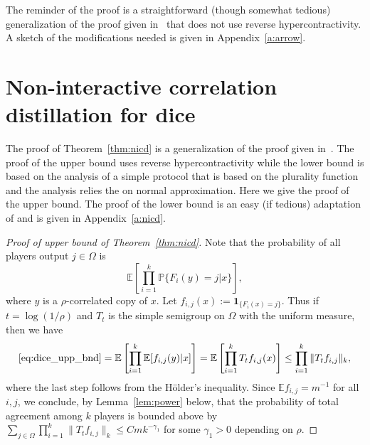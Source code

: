 \documentclass[11pt]{amsart}
\newcommand{\E}{\mathbb{E}}
\newcommand{\PP}{\mathbb{P}}
\newcommand{\1}{\mathbf{1}}
\def\E{{\mathbb E}}
\theoremstyle{definition}
\theoremstyle{plain}
\newtheorem{theorem}[example]{Theorem}
\theoremstyle{remark}
\numberwithin{equation}{section}
\begin{document}
The reminder of the proof is a straightforward (though somewhat tedious) generalization of the proof given in~\cite{Mossel11} that does not use reverse hypercontractivity.  A sketch of the modifications needed is given in Appendix~\ref{a:arrow}.

\section{Non-interactive correlation  distillation for dice}

The proof of Theorem~\ref{thm:nicd} is a generalization of the proof given in~\cite{Mossel06}.
The proof of the upper bound uses reverse hypercontractivity while the lower bound is based on the analysis of a simple protocol that is based on the plurality function and the analysis relies the on normal approximation. Here we give the proof of the upper bound. The proof of the lower bound is an easy (if tedious) adaptation of \cite{Mossel06} and is given in Appendix~\ref{a:nicd}.

\begin{proof}[Proof of upper bound of Theorem~\ref{thm:nicd}]  Note that the probability of all players output $j \in \Omega$ is
\begin{equation}
\label{eq:dice_upp_bnd}
\E \left[ \prod_{i=1}^k \PP \{F_i(y) = j| x\} \right ],
\end{equation}
where $y$ is a $\rho$-correlated copy of $x$. Let $f_{i, j}(x) := \1_{ \{F_i(x) = j \}}$. Thus  if
$t=\log(1/\rho)$ and $T_t$ is the simple semigroup on $\Omega$ with the uniform measure,  then we have
\[  \text{\eqref{eq:dice_upp_bnd}} =  \E \left[ \prod_{i=1}^k \E [f_{i, j}(y) | x] \right ]  =   \E \left[ \prod_{i=1}^k T_t f_{i, j}(x)  \right ]  \le   \prod_{i=1}^k  \|  T_t f_{i, j}\|_k, \]
where the last step follows from the H\"{o}lder's inequality. Since $\E f_{i, j} = m^{-1}$ for all $i, j$,  we conclude, by Lemma~\ref{lem:power} below, that the probability of total agreement among $k$ players is bounded above  by $\sum_{j \in \Omega} \prod_{i=1}^k  \|  T_t f_{i, j}\|_k \le Cm k^{-\gamma_1}$ for some $\gamma_1>0$ depending on $\rho$.
\end{proof}
\end{document}
